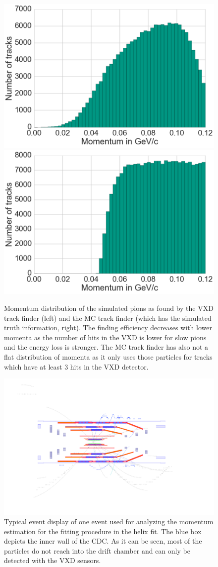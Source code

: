 \begin{figure}
 \centering
 \includegraphics[width=0.48\linewidth]{figures/vxd/finding_efficiency.png}
 \includegraphics[width=0.48\linewidth]{figures/vxd/finding_efficiency_mc.png}
 \caption[Momentum distribution of the found and simulated pions.]{Momentum distribution of the simulated pions as found by the VXD track finder (left) and the MC track finder (which has the simulated truth information, right). The finding efficiency decreases with lower momenta as the number of hits in the VXD is lower for slow pions and the energy loss is stronger. The MC track finder has also not a flat distribution of momenta as it only uses those particles for tracks which have at least 3 hits in the VXD detector.}
 \label{fig-vxd-finding-efficiency}
\end{figure}

\begin{figure}
 \centering
 \includegraphics[width=0.8\linewidth]{figures/vxd/event_display.png}
 \caption[Typical event display of slow pions.]{Typical event display of one event used for analyzing the momentum estimation for the fitting procedure in the helix fit. The blue box depicts the inner wall of the CDC. As it can be seen, most of the particles do not reach into the drift chamber and can only be detected with the VXD sensors.}
 \label{fig-vxd-event-display}
\end{figure}


